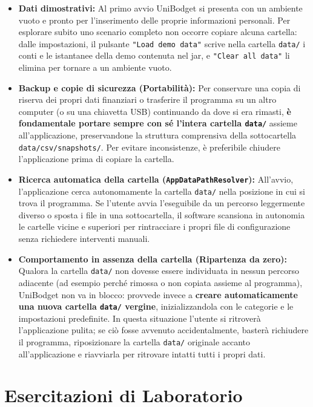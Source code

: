 \documentclass[11pt,a4paper,openright]{report}
\begin{document}
\begin{itemize}
    \item \textbf{Dati dimostrativi:}
    Al primo avvio UniBodget si presenta con un ambiente vuoto e pronto per l'inserimento delle proprie informazioni personali. Per esplorare subito uno scenario completo non occorre copiare alcuna cartella: dalle impostazioni, il pulsante \texttt{"Load demo data"} scrive nella cartella \texttt{data/} i conti e le istantanee della demo contenuta nel jar, e \texttt{"Clear all data"} li elimina per tornare a un ambiente vuoto.

    \item \textbf{Backup e copie di sicurezza (Portabilità):}
    Per conservare una copia di riserva dei propri dati finanziari o trasferire il programma su un altro computer (o su una chiavetta USB) continuando da dove si era rimasti, \textbf{è fondamentale portare sempre con sé l'intera cartella \texttt{data/}} assieme all'applicazione, preservandone la struttura comprensiva della sottocartella \texttt{data/csv/snapshots/}. Per evitare inconsistenze, è preferibile chiudere l'applicazione prima di copiare la cartella.

    \item \textbf{Ricerca automatica della cartella (\texttt{AppDataPathResolver}):}
    All'avvio, l'applicazione cerca autonomamente la cartella \texttt{data/} nella posizione in cui si trova il programma. Se l'utente avvia l'eseguibile da un percorso leggermente diverso o sposta i file in una sottocartella, il software scansiona in autonomia le cartelle vicine e superiori per rintracciare i propri file di configurazione senza richiedere interventi manuali.

    \item \textbf{Comportamento in assenza della cartella (Ripartenza da zero):}
    Qualora la cartella \texttt{data/} non dovesse essere individuata in nessun percorso adiacente (ad esempio perché rimossa o non copiata assieme al programma), UniBodget non va in blocco: provvede invece a \textbf{creare automaticamente una nuova cartella \texttt{data/} vergine}, inizializzandola con le categorie e le impostazioni predefinite. In questa situazione l'utente si ritroverà l'applicazione pulita; se ciò fosse avvenuto accidentalmente, basterà richiudere il programma, riposizionare la cartella \texttt{data/} originale accanto all'applicazione e riavviarla per ritrovare intatti tutti i propri dati.
\end{itemize}

\chapter{Esercitazioni di Laboratorio}
\end{document}
